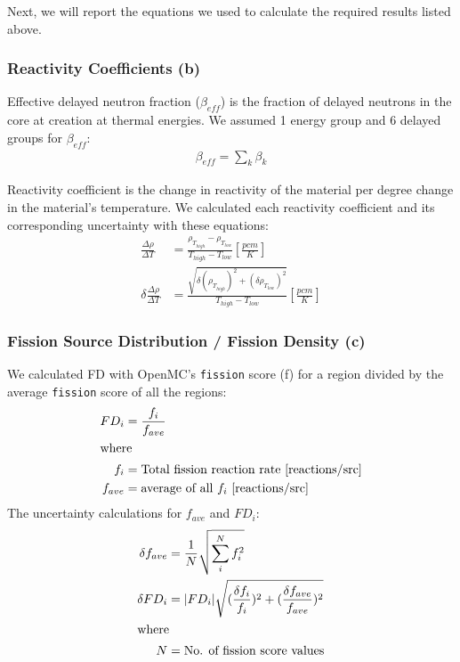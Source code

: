 Next, we will report the equations we used to calculate the required results 
listed above. 

\subsubsection{Reactivity Coefficients (b)}
Effective delayed neutron fraction ($\beta_{eff}$) is the fraction of delayed 
neutrons in the core at creation at thermal energies. 
We assumed 1 energy group and 6 delayed groups for $\beta_{eff}$: 
\begin{align}
    \beta_{eff} = \sum_k \beta_k
\end{align}

Reactivity coefficient is the change in reactivity of the material per degree 
change in the material's temperature. 
We calculated each reactivity coefficient and its corresponding uncertainty 
with these equations: 
\begin{align}
    \frac{\Delta \rho}{\Delta T} &= 
    \frac{\rho_{T_{high}}-\rho_{T_{low}}}{T_{high}-T_{low}} [\frac{pcm}{K}] \\
    \delta \frac{\Delta \rho}{\Delta T} &= 
    \frac{\sqrt{\delta (\rho_{T_{high}})^2+(\delta \rho_{T_{low}})^2}}{T_{high}-T_{low}} [\frac{pcm}{K}] 
\end{align}

\subsubsection{Fission Source Distribution / Fission Density (c)}
We calculated \gls{FD} with OpenMC's \texttt{fission} score (f) for a region 
divided by the average \texttt{fission} score of all the regions:
\begin{align}
    FD_i &=  \frac{f_i}{f_{ave}} \\
    \intertext{where}
    f_i &= \mbox{Total fission reaction rate [reactions/src]} \nonumber \\
    f_{ave} &= \mbox{average of all $f_i$ [reactions/src]} \nonumber
\end{align}
The uncertainty calculations for $f_{ave}$ and $FD_i$: 
\begin{align}
    \delta f_{ave} &= \frac{1}{N}\sqrt{\sum_i^Nf_i^2} \\
    \delta FD_i &= |FD_i| \sqrt{(\frac{\delta f_i}{f_i})^2+(\frac{\delta f_{ave}}{f_{ave}})^2} \\
    \intertext{where}
    N &= \mbox{No. of fission score values} \nonumber
\end{align}

